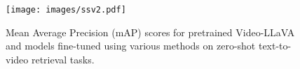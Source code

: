 \begin{figure}[t!]
\centering
\texttt{[image: images/ssv2.pdf]}
\vspace{-0.3cm}
\caption{Mean Average Precision (mAP) scores for pretrained Video-LLaVA and models fine-tuned using various methods on zero-shot text-to-video retrieval tasks. }
\label{fig:ssv2}
\vspace{-0.2cm}
\end{figure}

